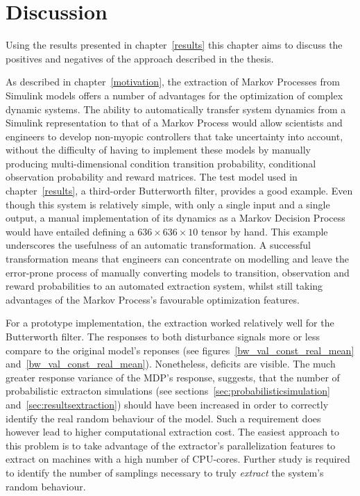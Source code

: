 \chapter{Discussion}
\label{discussion}

Using the results presented in chapter~\ref{results} this chapter aims to discuss the positives and negatives of the approach described in the thesis.

As described in chapter~\ref{motivation}, the extraction of Markov Processes from Simulink models offers a number of advantages for the optimization of complex dynamic systems. The ability to automatically transfer system dynamics from a Simulink representation to that of a Markov Process would allow scientists and engineers to develop non-myopic controllers that take uncertainty into account, without the difficulty of having to implement these models by manually producing multi-dimensional condition transition probability, conditional observation probability and reward matrices. The test model used in chapter~\ref{results}, a third-order Butterworth filter, provides a good example. Even though this system is relatively simple, with only a single input and a single output, a manual implementation of its dynamics as a Markov Decision Process would have entailed defining a $636\times636\times10$ tensor by hand. This example underscores the usefulness of an automatic transformation. A successful transformation means that engineers can concentrate on modelling and leave the error-prone process of manually converting models to transition, observation and reward probabilities to an automated extraction system, whilst still taking advantages of the Markov Process's favourable optimization features.

For a prototype implementation, the extraction worked relatively well for the Butterworth filter. The responses to both disturbance signals more or less compare to the original model's reponses (see figures~\ref{bw_val_const_real_mean} and~\ref{bw_val_const_real_mean}). Nonetheless, deficits are visible. The much greater response variance of the MDP's response, suggests, that the number of probabilistic extracton simulations (see sections~\ref{sec:probabilisticsimulation} and~\ref{sec:resultsextraction}) should have been increased in order to correctly identify the real random behaviour of the model. Such a requirement does however lead to higher computational extraction cost. The easiest approach to this problem is to take advantage of the extractor's parallelization features to extract on machines with a high number of CPU-cores. Further study is required to identify the number of samplings necessary to truly \textit{extract} the system's random behaviour.

